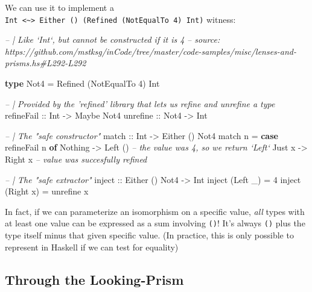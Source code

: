 \documentclass[]{article}
\newenvironment{Shaded}{}{}
\newcommand{\CommentTok}[1]{\textcolor[rgb]{0.38,0.63,0.69}{\textit{#1}}}
\newcommand{\DataTypeTok}[1]{\textcolor[rgb]{0.56,0.13,0.00}{#1}}
\newcommand{\DecValTok}[1]{\textcolor[rgb]{0.25,0.63,0.44}{#1}}
\newcommand{\FunctionTok}[1]{\textcolor[rgb]{0.02,0.16,0.49}{#1}}
\newcommand{\KeywordTok}[1]{\textcolor[rgb]{0.00,0.44,0.13}{\textbf{#1}}}
\newcommand{\NormalTok}[1]{#1}
\newcommand{\OtherTok}[1]{\textcolor[rgb]{0.00,0.44,0.13}{#1}}
\begin{document}
We can use it to implement a
\texttt{Int\ \textless{}\textasciitilde{}\textgreater{}\ Either\ ()\ (Refined\ (NotEqualTo\ 4)\ Int)}
witness:

\begin{Shaded}
\begin{Highlighting}[]
\CommentTok{-- | Like `Int`, but cannot be constructed if it is 4}
\CommentTok{-- source: https://github.com/mstksg/inCode/tree/master/code-samples/misc/lenses-and-prisms.hs#L292-L292}

\KeywordTok{type} \DataTypeTok{Not4} \FunctionTok{=} \DataTypeTok{Refined}\NormalTok{ (}\DataTypeTok{NotEqualTo} \DecValTok{4}\NormalTok{) }\DataTypeTok{Int}

\CommentTok{-- | Provided by the 'refined' library that lets us refine and unrefine a type}
\OtherTok{refineFail ::} \DataTypeTok{Int}  \OtherTok{->} \DataTypeTok{Maybe} \DataTypeTok{Not4}
\OtherTok{unrefine   ::} \DataTypeTok{Not4} \OtherTok{->} \DataTypeTok{Int}


\CommentTok{-- | The "safe constructor"}
\OtherTok{match ::} \DataTypeTok{Int} \OtherTok{->} \DataTypeTok{Either}\NormalTok{ () }\DataTypeTok{Not4}
\NormalTok{match n }\FunctionTok{=} \KeywordTok{case}\NormalTok{ refineFail n }\KeywordTok{of}
    \DataTypeTok{Nothing} \OtherTok{->} \DataTypeTok{Left}\NormalTok{ ()          }\CommentTok{-- the value was 4, so we return `Left`}
    \DataTypeTok{Just}\NormalTok{ x  }\OtherTok{->} \DataTypeTok{Right}\NormalTok{ x          }\CommentTok{-- value was succesfully refined}

\CommentTok{-- | The "safe extractor"}
\OtherTok{inject ::} \DataTypeTok{Either}\NormalTok{ () }\DataTypeTok{Not4} \OtherTok{->} \DataTypeTok{Int}
\NormalTok{inject (}\DataTypeTok{Left}\NormalTok{  _) }\FunctionTok{=} \DecValTok{4}
\NormalTok{inject (}\DataTypeTok{Right}\NormalTok{ x) }\FunctionTok{=}\NormalTok{ unrefine x}
\end{Highlighting}
\end{Shaded}

In fact, if we can parameterize an isomorphism on a specific value, \emph{all}
types with at least one value can be expressed as a sum involving \texttt{()}!
It's always \texttt{()} plus the type itself minus that given specific value.
(In practice, this is only possible to represent in Haskell if we can test for
equality)

\hypertarget{through-the-looking-prism}{%
\subsection{Through the Looking-Prism}\label{through-the-looking-prism}}
\end{document}
